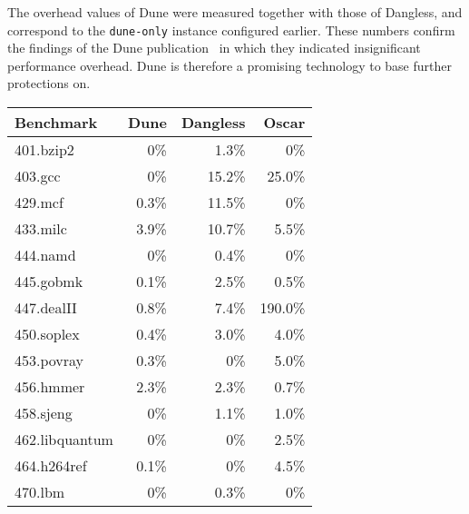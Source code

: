 The overhead values of Dune were measured together with those of Dangless, and correspond to the \texttt{dune-only} instance configured earlier. These numbers confirm the findings of the Dune publication~\cite{dune-paper} in which they indicated insignificant performance overhead. Dune is therefore a promising technology to base further protections on.

\begin{table}[]
	\centering
	\begin{tabular}{|l|r|r|r|}
		\hline
		\textbf{Benchmark} & \textbf{Dune} & \textbf{Dangless} & \textbf{Oscar} \\ \hline
		401.bzip2          & 0\%         & 1.3\%             & 0\%                      \\ \hline
		403.gcc            & 0\%         & 15.2\%             & {\color{orange} 25.0\%}                      \\ \hline
		429.mcf            & 0.3\%         & 11.5\%             & 0\%                      \\ \hline
		433.milc           & 3.9\%         & 10.7\%             & 5.5\%                      \\ \hline
		444.namd           & 0\%         & 0.4\%             & 0\%                      \\ \hline
		445.gobmk          & 0.1\%         & 2.5\%             & 0.5\%                      \\ \hline
		447.dealII         & 0.8\%         & 7.4\%             & {\color{red} 190.0\%}                      \\ \hline
		450.soplex         & 0.4\%         & 3.0\%             & 4.0\%                      \\ \hline
		453.povray         & 0.3\%         & 0\%             & 5.0\%                      \\ \hline
		456.hmmer          & 2.3\%         & 2.3\%             & 0.7\%                      \\ \hline
		458.sjeng          & 0\%         & 1.1\%             & 1.0\%                      \\ \hline
		462.libquantum     & 0\%         & 0\%             & 2.5\%                      \\ \hline
		464.h264ref        & 0.1\%         & 0\%             & 4.5\%                      \\ \hline
		470.lbm            & 0\%         & 0.3\%             & 0\%                      \\ \hline

\end{tabular}
\end{table}
